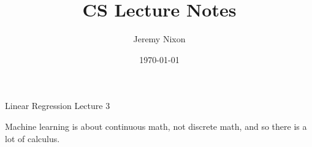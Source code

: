 \documentclass[12pt]{article}
\begin{document}
\title{CS Lecture Notes}
\author{Jeremy Nixon \\
}
\date{\today}
\maketitle
\thispagestyle{empty}
\bigskip


Linear Regression
Lecture 3


Machine learning is about continuous math, not discrete math, and so there is a lot of calculus. 
\end{document}
